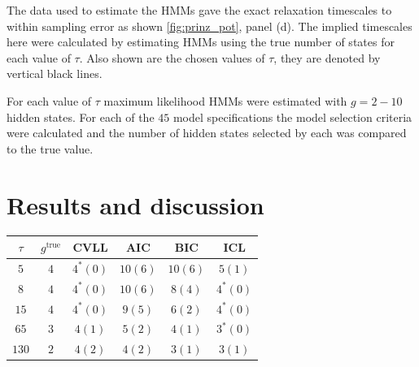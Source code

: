 The data used to estimate the HMMs gave the exact relaxation timescales to within sampling error as shown  \ref{fig:prinz_pot}, panel (d).  The implied timescales here were calculated by estimating HMMs using the true number of states for each value of $\tau$.  Also shown are the chosen values of $\tau$, they are denoted by vertical black lines. 

For each value of $\tau$ maximum likelihood HMMs were estimated with $g = 2 - 10$ hidden states. For each of the $45$ model specifications the model selection criteria were calculated  and the number of hidden states selected by each was compared to the true value. 

\section{Results and discussion}\label{sec:hmm_results}
\begin{table}
    \centering
    \begin{tabular}{|c|c|c|c|c|c|}
    \hline
    $\tau$ & $g^{\mathrm{true}}$ & CVLL & AIC & BIC & ICL  \\
    \hline\hline
     $5$  & $4$ & $4^{*} (0)$  & $10 (6)$ & $10 (6)$ & $5 (1)$ \\
     $8$  & $4$ & $4^{*} (0)$ & $10 (6)$ & $8 (4)$  & $4^{*} (0)$  \\
     $15$ & $4$ & $4^{*} (0)$  & $9 (5)$ & $6 (2)$  & $4^{*} (0)$  \\
     $65 $& $3$ & $4 (1)$  & $5 (2)$  & $4 (1)$  & $3^{*} (0)$  \\
     $130$& $2$ & $4 (2)$  & $4 (2)$  & $3 (1)$  & $3 (1)$  \\
     \hline
    \end{tabular}
    \label{tab:prinz_criteria_results}
\end{table}

